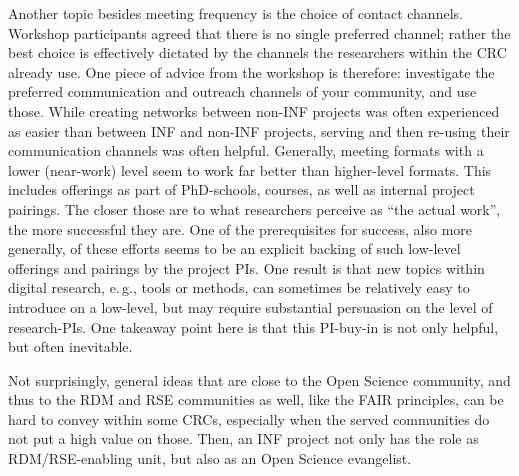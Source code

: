 \documentclass{eceasst}
\newcommand{\eg}{e.\,g.}
\begin{document}
Another topic besides meeting frequency is the choice of contact channels.
Workshop participants agreed that there is no single preferred channel; rather
the best choice is effectively dictated by the channels the researchers within the CRC already use.
One piece of advice from the workshop is therefore: investigate the preferred communication and outreach channels of your community, and use those. 
While creating networks between non-INF projects was often experienced as easier than between INF and non-INF projects, serving and then re-using their communication channels was often helpful.
Generally, meeting formats with a lower (near-work) level seem to work far better than higher-level formats.
This includes offerings as part of PhD-schools, courses, as well as internal project pairings.
The closer those are to what researchers perceive as “the actual work”, the more successful they are.
One of the prerequisites for success, also more generally,
of these efforts seems to be an explicit backing of such low-level offerings and pairings by the project PIs.
One result is that new topics within digital research, \eg, tools or methods, can sometimes be relatively easy to introduce on a low-level, but may require substantial persuasion on the level of research-PIs.
One takeaway point here is that this PI-buy-in is not only helpful, but often inevitable.

Not surprisingly, general ideas that are close to the Open Science community, and thus to the RDM and RSE communities as well, like the FAIR principles,
can be hard to convey within some CRCs, especially when the served communities do not put a high value on those.
Then, an INF project not only has the role as RDM/RSE-enabling unit, but also as an Open Science evangelist.
\vspace{-3em}
\end{document}
